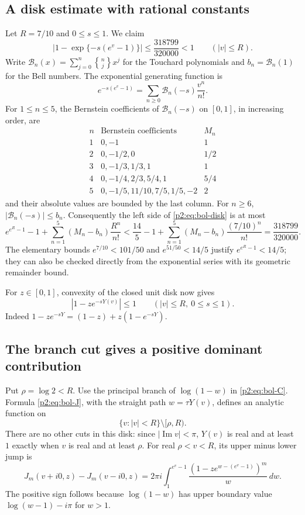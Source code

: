 \documentclass[11pt,a4paper]{article}
\theoremstyle{definition}
\theoremstyle{remark}
\numberwithin{equation}{section}
\begin{document}
\subsection{A disk estimate with rational constants}
Let $R=7/10$ and $0\le s\le1$.  We claim
\begin{equation}\label{p2:eq:bol-disk}
 \left|1-\exp\{-s(e^v-1)\}\right|
 \le\frac{318799}{320000}<1\qquad (|v|\le R).
\end{equation}
Write $\mathcal B_n(x)=\sum_{j=0}^n\genfrac{\{}{\}}{0pt}{}{n}{j}x^j$
for the Touchard polynomials and $b_n=\mathcal B_n(1)$ for the Bell numbers.
The exponential generating function is
\[
 e^{-s(e^v-1)}=\sum_{n\ge0}\mathcal B_n(-s)\frac{v^n}{n!}.
\]
For $1\le n\le5$, the Bernstein coefficients of $\mathcal B_n(-s)$
on $[0,1]$, in increasing order, are
\[
\begin{array}{c|l|c}
 n&\text{Bernstein coefficients}&M_n\\ \hline
 1&0,-1&1\\
 2&0,-1/2,0&1/2\\
 3&0,-1/3,1/3,1&1\\
 4&0,-1/4,2/3,5/4,1&5/4\\
 5&0,-1/5,11/10,7/5,1/5,-2&2
\end{array}
\]
and their absolute values are bounded by the last column.  For $n\ge6$,
$|\mathcal B_n(-s)|\le b_n$.  Consequently the left side of
\eqref{p2:eq:bol-disk} is at most
\[
 e^{e^R-1}-1+\sum_{n=1}^5(M_n-b_n)\frac{R^n}{n!}
 <\frac{14}{5}-1+\sum_{n=1}^5(M_n-b_n)\frac{(7/10)^n}{n!}
 =\frac{318799}{320000}.
\]
The elementary bounds $e^{7/10}<101/50$ and $e^{51/50}<14/5$ justify
$e^{e^R-1}<14/5$; they can also be checked directly from the exponential
series with its geometric remainder bound.

For $z\in[0,1]$, convexity of the closed unit disk now gives
\begin{equation}\label{p2:eq:bol-kernelbound}
 |1-z e^{-sY(v)}|\le1 \qquad (|v|\le R,\ 0\le s\le1).
\end{equation}
Indeed $1-z e^{-sY}=(1-z)+z(1-e^{-sY})$.

\subsection{The branch cut gives a positive dominant contribution}
Put $\rho=\log2<R$.  Use the principal branch of $\log(1-w)$ in
\eqref{p2:eq:bol-C}.  Formula \eqref{p2:eq:bol-J}, with the straight path
$w=\tau Y(v)$, defines an analytic function on
\[
 \{v:|v|<R\}\setminus[\rho,R).
\]
There are no other cuts in this disk: since $|\operatorname{Im}v|<\pi$,
$Y(v)$ is real and at least $1$ exactly when $v$ is real and at least
$\rho$.  For real $\rho<v<R$, its upper minus lower jump is
\begin{equation}\label{p2:eq:bol-jump}
 J_m(v+i0,z)-J_m(v-i0,z)
 =2\pi i\int_1^{e^v-1}
            \frac{(1-z e^{w-(e^v-1)})^m}{w}\,dw.
\end{equation}
The positive sign follows because $\log(1-w)$ has upper boundary value
$\log(w-1)-i\pi$ for $w>1$.
\end{document}

